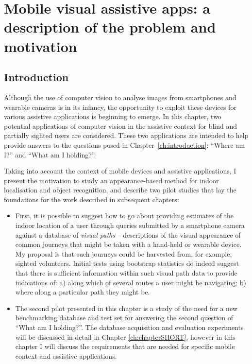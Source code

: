 \chapter{Mobile visual assistive apps: a description of the problem and motivation}\label{ch:chapter2}

\section{Introduction}

Although the use of computer vision to analyse images from smartphones and wearable cameras is in its infancy, the opportunity to exploit these devices for various assistive applications is beginning to emerge. In this chapter, two potential applications of computer vision in the assistive context for blind and partially sighted users are considered. These two applications are intended to help provide answers to the questions posed in Chapter~\ref{ch:introduction}: ``Where am I?'' and ``What am I holding?''.

Taking into account the context of mobile devices and assistive applications, I present the motivation to study an appearance-based method for indoor localisation and object recognition, and describe two pilot studies that lay the foundations for the work described in subsequent chapters:

\begin{itemize}
\item First, it is possible to suggest how to go about providing estimates of the indoor location of a user through queries submitted by a smartphone camera against a database of \textit{visual paths} -- descriptions of the visual appearance of common journeys that might be taken with a hand-held or wearable device. My proposal is that such journeys could be harvested from, for example, sighted volunteers. Initial tests using bootstrap statistics do indeed suggest that there is sufficient information within such visual path data to provide indications of: a) along which of several routes a user might be navigating; b) where along a particular path they might be.
\item The second pilot presented in this chapter is a study of the need for a new benchmarking database and test set for answering the second question of ``What am I holding?''. The database acquisition and evaluation experiments will be discussed in detail in Chapter \ref{ch:chapterSHORT}, however in this chapter I will discuss the requirements that are needed for specific mobile context and assistive applications.
\end{itemize}



